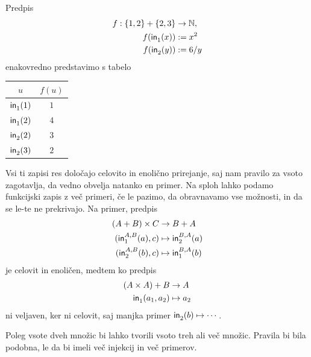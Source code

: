 \begin{zgled}
  Predpis
  \begin{align*}
    f : \set{1, 2} + \set{2, 3} &\to \NN, \\
    f(\inl(x)) &\defeq x^2 \\
    f(\inr(y)) &\defeq 6 / y
  \end{align*}
  enakovredno predstavimo s tabelo
  \begin{center}
    \begin{tabular}{cc}
      \toprule
      $u$ & $f(u)$ \\ \midrule
      $\inl(1)$ & $1$ \\
      $\inl(2)$ & $4$ \\
      $\inr(2)$ & $3$ \\
      $\inr(3)$ & $2$ \\ \bottomrule
    \end{tabular}
  \end{center}
\end{zgled}

Vsi ti zapisi res določajo celovito in enolično prirejanje, saj nam pravilo za vsoto
zagotavlja, da vedno obvelja natanko en primer. Na sploh lahko podamo funkcijski zapis z
več primeri, če le pazimo, da obravnavamo vse možnosti, in da se le-te ne prekrivajo.
Na primer, predpis
%
\begin{align*}
  (A + B) \times C &\to B + A \\
  (\inl[A][B](a), c) &\mapsto \inr[B][A](a) \\
  (\inr[A][B](b), c) &\mapsto \inl[B][A](b)
\end{align*}
%
je celovit in enoličen, medtem ko predpis
%
\begin{align*}
  (A \times A) + B &\to A \\
  \inl(a_1, a_2) &\mapsto a_2
\end{align*}
%
ni veljaven, ker ni celovit, saj manjka primer $\inr(b) \mapsto \cdots$.

Poleg vsote dveh množic bi lahko tvorili vsoto treh ali več množic. Pravila bi bila
podobna, le da bi imeli več injekcij in več primerov.






